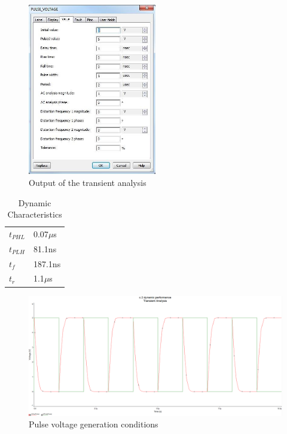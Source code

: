 \documentclass[12pt]{article}
\begin{document}
\begin{figure}[H]
\centering
\includegraphics[width=0.5\textwidth]{8.jpg}
\caption{Output of the transient analysis}
\end{figure}

\begin{table}[H]
\centering
\begin{tabular}{ll}
$t_{PHL}$ & 0.07$\mu$s\\
$t_{PLH}$ & 81.1ns \\
$t_{f}$ & 187.1ns \\
$t_{r}$ & 1.1$\mu$s
\end{tabular}
\caption{Dynamic Characteristics}
\end{table}

\begin{figure}[H]
\centering
\includegraphics[width=1\textwidth]{c25.PNG}
\caption{Pulse voltage generation conditions}
\end{figure}
\end{document}
